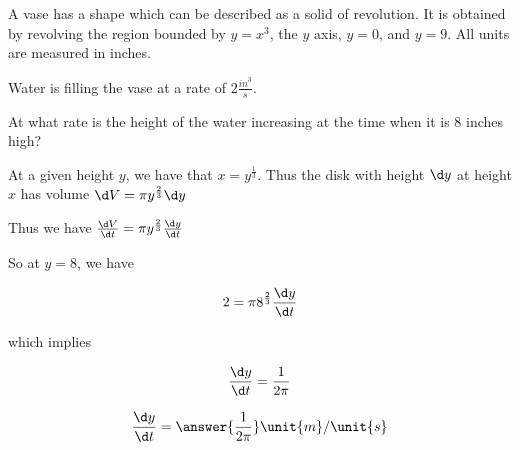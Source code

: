 \documentclass{ximera}
\author{Steven Gubkin}
\begin{document}
\begin{exercise}


A vase has a shape which can be described as a solid of revolution.  It is obtained by revolving the region bounded by $y=x^3$, the $y$ axis, $y=0$, and $y=9$.  All units are measured in inches.

Water is filling the vase at a rate of $2 \frac{\unit{in}^3}{\unit{s}}$.

At what rate is the height of the water increasing at the time when it is $8$ inches high?

\begin{hint}
	At a given height $y$, we have that $x  = y^{\frac{1}{3}}$.  Thus the disk with height $\d y$ at height $x$ has volume $\d V = \pi y^{\frac{2}{3}} \d y$
\end{hint}

\begin{hint}
	Thus we have $\frac{\d V}{\d t} = \pi y^{\frac{2}{3}} \frac{\d y}{\d t}$
\end{hint}

\begin{hint}
	So at $y=8$, we have
	
	\[
	2 = \pi 8^\frac{2}{3} \frac{\d y}{\d t}
	\]
	
	which implies
	
	\[
	\frac{\d y}{\d t} = \frac{1}{2\pi}
	\]
\end{hint}

\begin{prompt}
	\[
	\frac{\d y}{\d t} = \answer{\frac{1}{2\pi}} \unit{m}/\unit{s}
	\]
\end{prompt}
\end{exercise}
\end{document}
